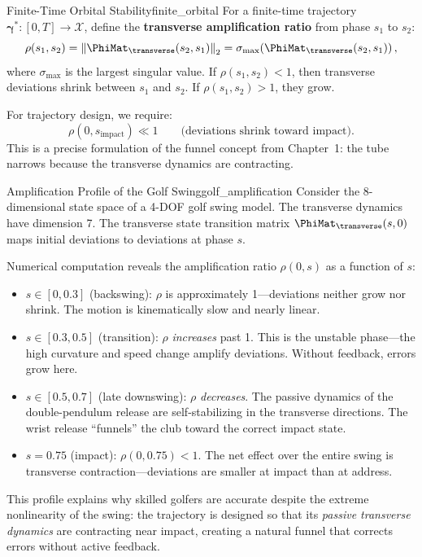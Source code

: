 \documentclass[12pt, openany]{book}
\theoremstyle{plain}
\newcommand{\traj}{\bm{\gamma}}
\newcommand{\statespace}{\mathcal{X}}
\newcommand{\norm}[1]{\left\lVert #1 \right\rVert}
\begin{document}
\begin{principle}{Finite-Time Orbital Stability}{finite_orbital}
  For a finite-time trajectory $\traj^*: [0, T] \to \statespace$, define
  the \textbf{transverse amplification ratio} from phase $s_1$ to $s_2$:
  \begin{equation}\label{eq:amplification}
    \rho(s_1, s_2) = \norm{\PhiMat_\transverse(s_2, s_1)}_2
    = \sigma_{\max}\!\left(\PhiMat_\transverse(s_2, s_1)\right),
  \end{equation}
  where $\sigma_{\max}$ is the largest singular value. If
  $\rho(s_1, s_2) < 1$, then transverse deviations shrink between $s_1$
  and $s_2$. If $\rho(s_1, s_2) > 1$, they grow.

  For trajectory design, we require:
  \begin{equation}
    \rho(0, s_{\text{impact}}) \ll 1 \qquad \text{(deviations shrink
    toward impact)}.
  \end{equation}
  This is a precise formulation of the funnel concept from Chapter~1:
  the tube narrows because the transverse dynamics are contracting.
\end{principle}

\begin{example}{Amplification Profile of the Golf Swing}{golf_amplification}
  Consider the 8-dimensional state space of a 4-DOF golf swing model.
  The transverse dynamics have dimension 7. The transverse state transition
  matrix $\PhiMat_\transverse(s, 0)$ maps initial deviations to deviations at
  phase $s$.

  Numerical computation reveals the amplification ratio $\rho(0, s)$ as a
  function of $s$:
  \begin{itemize}[leftmargin=1cm]
    \item $s \in [0, 0.3]$ (backswing): $\rho$ is approximately 1---deviations
      neither grow nor shrink. The motion is kinematically slow and nearly
      linear.
    \item $s \in [0.3, 0.5]$ (transition): $\rho$ \emph{increases} past 1.
      This is the unstable phase---the high curvature and speed change
      amplify deviations. Without feedback, errors grow here.
    \item $s \in [0.5, 0.7]$ (late downswing): $\rho$ \emph{decreases}.
      The passive dynamics of the double-pendulum release are
      self-stabilizing in the transverse directions. The wrist release
      ``funnels'' the club toward the correct impact state.
    \item $s = 0.75$ (impact): $\rho(0, 0.75) < 1$. The net effect over
      the entire swing is transverse contraction---deviations are smaller
      at impact than at address.
  \end{itemize}

  This profile explains why skilled golfers are accurate despite the
  extreme nonlinearity of the swing: the trajectory is designed so that its
  \emph{passive transverse dynamics} are contracting near impact, creating
  a natural funnel that corrects errors without active feedback.
\end{example}
\end{document}
